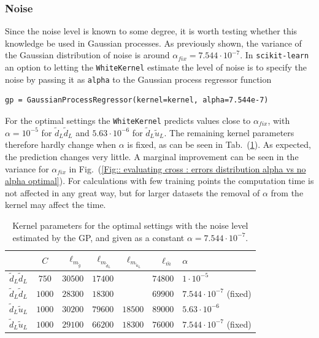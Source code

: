 \documentclass[twoside,english]{uiofysmaster}
\begin{document}
\subsubsection{Noise}

Since the noise level is known to some degree, it is worth testing whether this knowledge be used in Gaussian processes. As previously shown, the variance of the Gaussian distribution of noise is around $\alpha_{fix} = 7.544 \cdot 10^{-7}$. In \verb|scikit-learn| an option to letting the \verb|WhiteKernel| estimate the level of noise is to specify the noise by passing it as \verb|alpha| to the Gaussian process regressor function
\begin{lstlisting}
gp = GaussianProcessRegressor(kernel=kernel, alpha=7.544e-7)
\end{lstlisting}
For the optimal settings the \verb|WhiteKernel| predicts values close to $\alpha_{fix}$, with $\alpha=10^{-5}$ for $\tilde{d}_L \tilde{d}_L$ and $5.63 \cdot 10^{-6}$ for $\tilde{d}_L \tilde{u}_L$. The remaining kernel parameters therefore hardly change when $\alpha$ is fixed, as can be seen in Tab.\ (\ref{Tab:: evaluating cross : optimal kernel parameters alpha}). As expected, the prediction changes very little. A marginal improvement can be seen in the variance for $\alpha_{fix}$ in Fig.\ (\ref{Fig:: evaluating cross : errors distribution alpha vs no alpha optimal}). For calculations with few training points the computation time is not affected in any great way, but for larger datasets the removal of $\alpha$ from the kernel may affect the time. 

\begin{table}
\centering
\begin{tabular}{c|c|r|r|r|r|l}
& $C$ & $\ell_{m_{\tilde{g}}}$ & $\ell_{m_{\tilde{d}_L}}$ &$\ell_{m_{\tilde{u}_L}}$ & $\ell_{\bar{m}}$ & $\alpha$\\
\hline
$\tilde{d}_L \tilde{d}_L$ & $750$ & $30500$ & $17400$ && $74800$ & $1 \cdot 10^{-5}$\\
$\tilde{d}_L \tilde{d}_L$ & $1000$ & $28300$ & $18300$ && $69900$ & $7.544 \cdot 10^{-7}$ (fixed)\\
$\tilde{d}_L \tilde{u}_L$ & $1000$ & $30200$ & $79600$ & $18500$ & $89000$ & $5.63 \cdot 10^{-6}$\\
$\tilde{d}_L \tilde{u}_L$ & $1000$ & $29100$ & $66200$ & $18300$ & $76000$ & $7.544 \cdot 10^{-7}$ (fixed)\\
\end{tabular}
\caption{Kernel parameters for the optimal settings with the noise level estimated by the GP, and given as a constant $\alpha=7.544 \cdot 10^{-7}$.}
\label{Tab:: evaluating cross : optimal kernel parameters alpha}
\end{table}
\end{document}
